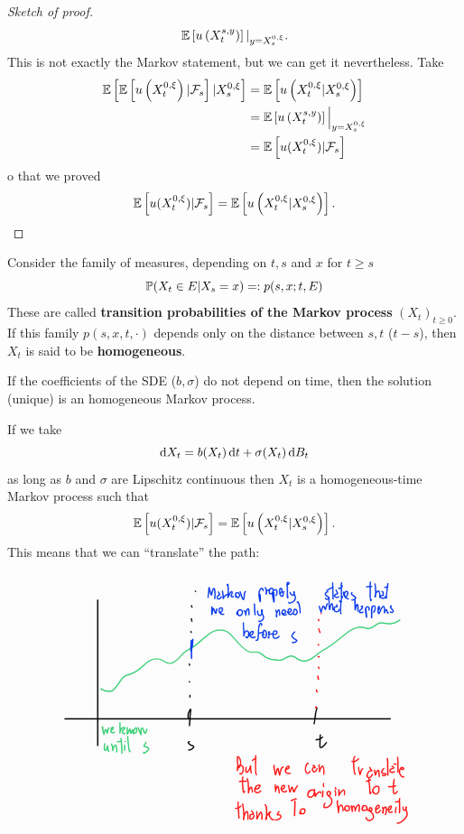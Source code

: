 \begin{ProofBox}
\begin{proof}[Sketch of proof]
\begin{equation*}
        	\mathbb{E}\left[{u\left(X_t^{s,y}\right)}\right]|_{y=X_s^{0,\xi}}.
        \end{equation*}
        This is not exactly the Markov statement, but we can get it nevertheless. Take
        \begin{align*}
        	\mathbb{E}\left[{\mathbb{E}\left[{u\left(X_t^{0,\xi}\right)|\mathcal{F}_s}\right]|X_s^{0,\xi}}\right]&=\mathbb{E}\left[{u\left(X_t^{0,\xi}|X_s^{0,\xi}\right)}\right]\\
        	&=\mathbb{E}\left[{u\left(X_t^{s,y}\right)}\right]\Big|_{y=X_s^{0,\xi}}\\
        	&=\mathbb{E}\left[{u(X_t^{0,\xi})|\mathcal{F}_s}\right]
        \end{align*}
        o that we proved
        \begin{equation*}
        	\mathbb{E}\left[{u(X_t^{0,\xi})|\mathcal{F}_s}\right]=\mathbb{E}\left[{u\left(X_t^{0,\xi}|X_s^{0,\xi}\right)}\right].
        \end{equation*}
    \end{proof}
\end{ProofBox}
Consider the family of measures, depending on $t,s$ and $x$ for $t \geq s$
\begin{equation*}
    \mathbb{P}(X_t \in E | X_s=x) =: p(s,x;t,E)
\end{equation*}
These are called \textbf{transition probabilities of the Markov process} $(X_t)_{t \geq 0}$. If this family $p(s,x,t,\cdot)$ depends only on the distance between $s,t$ ($t-s$), then $X_t$ is said to be \textbf{homogeneous}. 
\begin{PropBox}
    \begin{Cor}
        If the coefficients of the SDE ($b,\sigma$) do not depend on time, then the solution (unique) is an homogeneous Markov process. 
    \end{Cor}
\end{PropBox}
If we take
\begin{equation*}
	\mathop{}\!\mathrm{d} X_t=b(X_t)\mathop{}\!\mathrm{d} t+\sigma(X_t)\mathop{}\!\mathrm{d} B_t
\end{equation*}
as long as $b$ and $\sigma$ are Lipschitz continuous then $X_t$ is a homogeneous-time Markov process such that
\begin{equation*}
		\mathbb{E}\left[{u(X_t^{0,\xi})|\mathcal{F}_s}\right]=\mathbb{E}\left[{u\left(X_t^{0,\xi}|X_s^{0,\xi}\right)}\right].
\end{equation*}
This means that we can ``translate'' the path:
\begin{figure}[H]
	\centering
	\includegraphics[width=0.7\linewidth]{screenshot001}
\end{figure}
